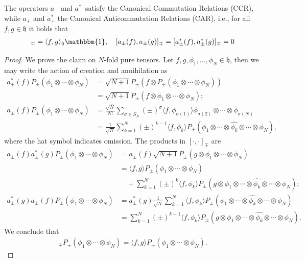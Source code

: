 \begin{proposition}
	The operators $a_-$ and $a^*_-$ satisfy the Canonical Commutation Relations (CCR), while
	$a_+$ and $a^*_+$ the Canonical Anticommutation Relations (CAR), i.e., for all $f,g\in
	\mathfrak{h}$ it holds that
	\begin{align*}
		[a_\pm(f),a^*_\pm(g)]_\mp = \langle f,g \rangle_\mathfrak{h}\mathbbm{1},
		\quad [a_\pm(f),a_\pm(g)]_\mp=[a^*_\pm(f),a^*_\pm(g)]_\mp=0\\
	\end{align*}
\end{proposition}
\begin{proof}
	We prove the claim on $N$-fold pure tensors. Let $f,g,\phi_1,\ldots,\phi_N\in\mathfrak{h}$,
	then we may write the action of creation and annihilation as
	\begin{align*}
		a^*_\pm(f)P_\pm(\phi_1\otimes\cdots\otimes\phi_N)
		&= \sqrt{N+1}P_\pm(f\otimes P_\pm(\phi_1\otimes\cdots\otimes\phi_N))\\
		&= \sqrt{N+1}P_\pm(f\otimes\phi_1\otimes\cdots\otimes\phi_N);\\
		a_\pm(f)P_\pm(\phi_1\otimes\cdots\otimes\phi_N)
		&= \frac{\sqrt{N}}{N!}\sum_{\sigma\in S_N}(\pm)^\sigma\langle f,\phi_{\sigma(1)}\rangle\phi_{\sigma(2)}\otimes\cdots\otimes\phi_{\sigma(N)}\\
		&= \frac{1}{\sqrt{N}}\sum_{k=1}^N(\pm)^{k-1}\langle f,\phi_k\rangle P_\pm(\phi_1\otimes\cdots\otimes\widehat{\phi_k}\otimes\cdots\otimes\phi_N),
	\end{align*}
	where the hat symbol indicates omission. The products in $[\cdot,\cdot]_\mp$ are
	\begin{align*}
		a_\pm(f)a^*_\pm(g)P_\pm(\phi_1\otimes\cdots\otimes\phi_N)
		&= a_\pm(f)\sqrt{N+1}P_\pm(g\otimes\phi_1\otimes\cdots\otimes\phi_N)\\
		&= \langle f,g\rangle P_\pm(\phi_1\otimes\cdots\otimes\phi_N)\\
		&\quad+ \sum_{k=1}^N(\pm)^k\langle f,\phi_k\rangle P_\pm(g\otimes\phi_1\otimes\cdots\otimes\widehat{\phi_k}\otimes\cdots\otimes\phi_N);\\
		a^*_\pm(g)a_\pm(f)P_\pm(\phi_1\otimes\cdots\otimes\phi_N)
		&= a^*_\pm(g)\frac{1}{\sqrt{N}}\sum_{k=1}^N\langle f,\phi_k\rangle P_\pm(\phi_1\otimes\cdots\otimes\widehat{\phi_k}\otimes\cdots\otimes\phi_N)\\
		&= \sum_{k=1}^N(\pm)^{k-1}\langle f,\phi_k\rangle P_\pm(g\otimes\phi_1\otimes\cdots\otimes\widehat{\phi_k}\otimes\cdots\otimes\phi_N).
	\end{align*}
	We conclude that
	\begin{align*}
		[a_\pm(f),a^*_\pm(g)]_\mp P_\pm(\phi_1\otimes\cdots\otimes\phi_N)
		= \langle f,g\rangle P_\pm(\phi_1\otimes\cdots\otimes\phi_N).
	\end{align*}
\end{proof}


